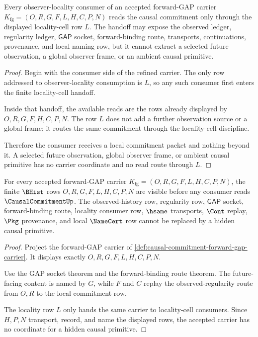 \begin{theorem}
\label{thm:causal-commitment-locality-cell-handoff}
Every observer-locality consumer of an accepted forward-GAP carrier $K_{\mathrm{fg}}=(O,R,G,F,L,H,C,P,N)$ reads the causal commitment only through the displayed locality-cell row $L$. The handoff may expose the observed ledger, regularity ledger, $\mathsf{GAP}$ socket, forward-binding route, transports, continuations, provenance, and local naming row, but it cannot extract a selected future observation, a global observer frame, or an ambient causal primitive.
\end{theorem}
\begin{proof}
Begin with the consumer side of the refined carrier. The only row addressed to observer-locality consumption is $L$, so any such consumer first enters the finite locality-cell handoff.

Inside that handoff, the available reads are the rows already displayed by $O,R,G,F,H,C,P,N$. The row $L$ does not add a further observation source or a global frame; it routes the same commitment through the locality-cell discipline.

Therefore the consumer receives a local commitment packet and nothing beyond it. A selected future observation, global observer frame, or ambient causal primitive has no carrier coordinate and no read route through $L$.
\end{proof}

\begin{theorem}
\label{thm:causal-commitment-carrier-visibility}
For every accepted forward-GAP carrier $K_{\mathrm{fg}}=(O,R,G,F,L,H,C,P,N)$, the finite $\BHist$ rows $O,R,G,F,L,H,C,P,N$ are visible before any consumer reads $\CausalCommitmentUp$. The observed-history row, regularity row, $\mathsf{GAP}$ socket, forward-binding route, locality consumer row, $\hsame$ transports, $\Cont$ replay, $\Pkg$ provenance, and local $\NameCert$ row cannot be replaced by a hidden causal primitive.
\end{theorem}
\begin{proof}
Project the forward-GAP carrier of \autoref{def:causal-commitment-forward-gap-carrier}. It displays exactly $O,R,G,F,L,H,C,P,N$.

Use the GAP socket theorem and the forward-binding route theorem. The future-facing content is named by $G$, while $F$ and $C$ replay the observed-regularity route from $O,R$ to the local commitment row.

The locality row $L$ only hands the same carrier to locality-cell consumers. Since $H,P,N$ transport, record, and name the displayed rows, the accepted carrier has no coordinate for a hidden causal primitive.
\end{proof}

